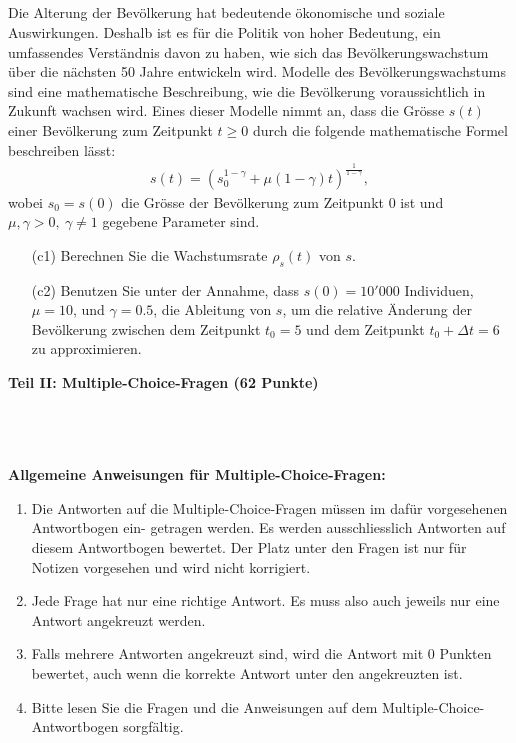 \subsection*{}
Die Alterung der Bevölkerung hat bedeutende ökonomische und soziale Auswirkungen. Deshalb ist es für die Politik von hoher Bedeutung, ein umfassendes Verständnis davon zu haben, wie sich das Bevölkerungswachstum über die nächsten 50 Jahre entwickeln wird.
Modelle des Bevölkerungswachstums sind eine mathematische Beschreibung, wie die Bevölkerung voraussichtlich in Zukunft wachsen wird.
Eines dieser Modelle nimmt an, dass die Grösse $s(t)$ einer Bevölkerung zum Zeitpunkt $t \geq 0$ durch die folgende mathematische Formel beschreiben lässt:
\begin{align*}
	s(t)
	=
	\left(s_0^{1- \gamma} + \mu (1 - \gamma)  t \right)^{\frac{1}{1- \gamma}},
\end{align*}
wobei $s_0 = s(0)$ die Grösse der Bevölkerung zum Zeitpunkt $0$ ist und $\mu, \gamma > 0, \ \gamma \neq 1$ gegebene Parameter sind.
\begin{enumerate}
	\item[(c1)] Berechnen Sie die Wachstumsrate $ \rho_s(t) $ von $ s $.
	\item[(c2)] Benutzen Sie unter der Annahme, dass $s(0) = 10'000 $ Individuen, $\mu = 10$, und $\gamma = 0.5$, die Ableitung von $s$, um die relative Änderung der Bevölkerung zwischen dem Zeitpunkt $t_0 = 5 $ und dem Zeitpunkt $t_0 + \Delta t = 6$ zu approximieren.
\end{enumerate}


\newpage


\begin{Large}
\textbf{Teil II: Multiple-Choice-Fragen (62 Punkte)}
\end{Large}
\\
\\
\\
\textbf{Allgemeine Anweisungen für Multiple-Choice-Fragen:}
\\
\renewcommand{\labelenumi}{(\roman{enumi})}
\begin{enumerate}
\item
Die Antworten auf die Multiple-Choice-Fragen müssen im dafür vorgesehenen Antwortbogen ein-
getragen werden. Es werden ausschliesslich Antworten auf diesem Antwortbogen bewertet. Der
Platz unter den Fragen ist nur für Notizen vorgesehen und wird nicht korrigiert.

\item
Jede Frage hat nur eine richtige Antwort. Es muss also auch jeweils nur eine Antwort angekreuzt werden.

\item
Falls mehrere Antworten angekreuzt sind, wird die Antwort mit 0 Punkten bewertet, auch wenn
die korrekte Antwort unter den angekreuzten ist.

\item
Bitte lesen Sie die Fragen und die Anweisungen auf dem Multiple-Choice-Antwortbogen sorgfältig.

\end{enumerate}

